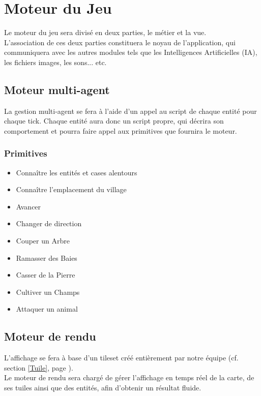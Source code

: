 \documentclass[a4paper]{article}
\newcommand{\alinea}{\hspace*{0.5cm}}
\begin{document}
    \section{Moteur du Jeu}
      \alinea Le moteur du jeu sera divisé en deux parties, le métier et la vue.\\
      L'association de ces deux parties constituera le noyau de l'application, qui communiquera avec les autres modules tels que les Intelligences Artificielles (IA), les fichiers images, les sons... etc.

      \subsection{Moteur multi-agent}
        \alinea La gestion multi-agent se fera à l'aide d'un appel au script de chaque entité pour chaque tick. Chaque entité aura donc un script propre, qui décrira son comportement et pourra faire appel aux primitives que fournira le moteur.

        \subsubsection{Primitives}
          \begin{itemize} \small
            \item Connaître les entités et cases alentours
            \item Connaître l'emplacement du village
            \item Avancer
            \item Changer de direction
            \item Couper un Arbre
            \item Ramasser des Baies
            \item Casser de la Pierre
            \item Cultiver un Champs
            \item Attaquer un animal
          \end{itemize} \normalsize


        \subsection{Moteur de rendu}
          \alinea L'affichage se fera à base d'un tileset créé entièrement par notre équipe (cf. section \ref{Tuile}, page \pageref{Tuile}).\\
          Le moteur de rendu sera chargé de gérer l'affichage en temps réel de la carte, de ses tuiles ainsi que des entités, afin d'obtenir un résultat fluide.
\end{document}
